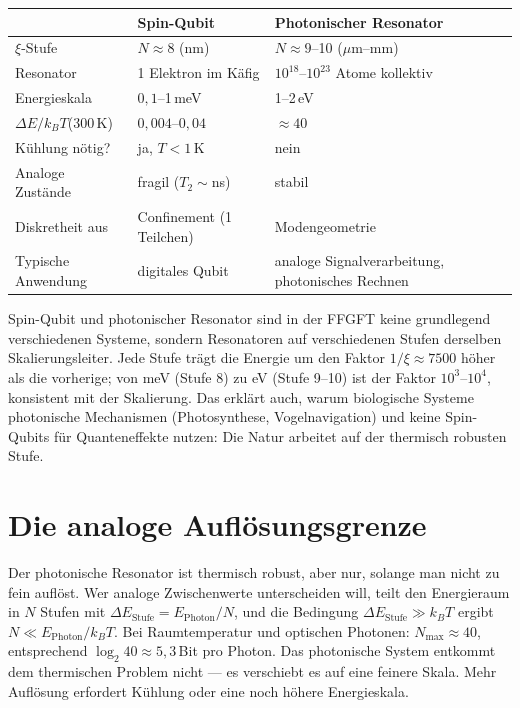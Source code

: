 \begin{center}
\small\renewcommand{\arraystretch}{1.3}
\begin{tabular}{p{2.6cm}p{2.8cm}p{3cm}}
\toprule
 & \textbf{Spin-Qubit} & \textbf{Photonischer Resonator} \\
\midrule
$\xi$-Stufe & $N\approx8$ (nm) & $N\approx9$--10 ($\mu$m--mm) \\
Resonator & 1 Elektron im Käfig & $10^{18}$--$10^{23}$ Atome kollektiv \\
Energieskala & $0{,}1$--1\,meV & 1--2\,eV \\
$\Delta E/k_BT$(300\,K) & $0{,}004$--$0{,}04$ & $\approx40$ \\
Kühlung nötig? & ja, $T<1$\,K & nein \\
Analoge Zustände & fragil ($T_2\sim$ns) & stabil \\
Diskretheit aus & Confinement (1 Teilchen) & Modengeometrie \\
Typische Anwendung & digitales Qubit & analoge Signalverarbeitung, photonisches Rechnen \\
\bottomrule
\end{tabular}
\end{center}

Spin-Qubit und photonischer Resonator sind in der FFGFT keine
grundlegend verschiedenen Systeme, sondern Resonatoren auf verschiedenen
Stufen derselben Skalierungsleiter. Jede Stufe trägt die Energie um den
Faktor $1/\xi\approx7500$ höher als die vorherige; von meV (Stufe 8) zu
eV (Stufe 9--10) ist der Faktor $10^3$--$10^4$, konsistent mit der
Skalierung. Das erklärt auch, warum biologische Systeme
photonische Mechanismen (Photosynthese, Vogelnavigation) und keine
Spin-Qubits für Quanteneffekte nutzen: Die Natur arbeitet auf der
thermisch robusten Stufe.

\section{Die analoge Auflösungsgrenze}

Der photonische Resonator ist thermisch robust, aber nur, solange man
nicht zu fein auflöst. Wer analoge Zwischenwerte unterscheiden will,
teilt den Energieraum in $N$ Stufen mit $\Delta E_{\mathrm{Stufe}} =
E_{\mathrm{Photon}}/N$, und die Bedingung $\Delta E_{\mathrm{Stufe}}\gg
k_BT$ ergibt $N\ll E_{\mathrm{Photon}}/k_BT$. Bei Raumtemperatur und
optischen Photonen: $N_{\max}\approx40$, entsprechend
$\log_2 40\approx5{,}3$\,Bit pro Photon. Das photonische System entkommt
dem thermischen Problem nicht --- es verschiebt es auf eine feinere
Skala. Mehr Auflösung erfordert Kühlung oder eine noch höhere
Energieskala.


